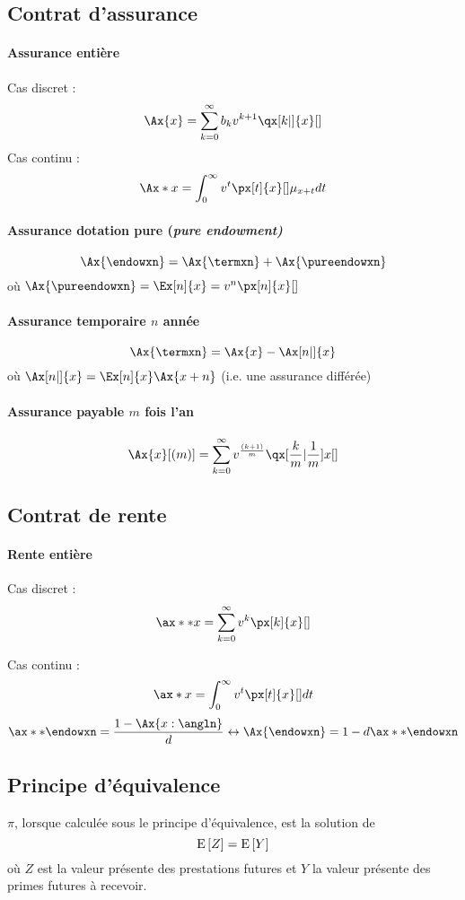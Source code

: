 \documentclass[10pt, french]{article}
\begin{document}
\begin{multicols*}{3}
\subsection*{Contrat d'assurance}
\paragraph{Assurance entière}
Cas discret : 
\[\Ax{x} = \sum_{k=0}^{\infty} b_k v^{k+1} \qx[k|]{x}[]\]
Cas continu : 
\[\Ax*{x} = \int_{0}^{\infty} v^t \px[t]{x}[] \mu_{x+t} dt  \]

\paragraph{Assurance dotation pure (\emph{pure endowment)}}
\[\Ax{\endowxn} = \Ax{\termxn} + \Ax{\pureendowxn}\]
où $\Ax{\pureendowxn} = \Ex[n]{x} = v^n \px[n]{x}[]$

\paragraph{Assurance temporaire $n$ année}
\[\Ax{\termxn} = \Ax{x} - \Ax[n|]{x} \]
où $\Ax[n|]{x}  = \Ex[n]{x} \Ax{x+n}$ (i.e. une assurance différée)

\paragraph{Assurance payable $m$ fois l'an}
\[\Ax{x}[(m)] = \sum_{k=0}^{\infty} v^{\frac{(k+1)}{m}} \qx[\frac{k}{m} | \frac{1}{m}]{x}[] \]


\subsection*{Contrat de rente}
\paragraph{Rente entière} Cas discret : 
\[\ax**{x} = \sum_{k=0}^{\infty} v^{k} \px[k]{x}[]  \]

Cas continu : 
\[\ax*{x} = \int_{0}^{\infty}  v^t \px[t]{x}[] dt \]
\[\ax**{\endowxn} = \frac{1 - \Ax{x:\angln}}{d} \leftrightarrow \Ax{\endowxn} =1 - d \ax**{\endowxn}\]




\subsection*{Principe d'équivalence}
$\pi$, lorsque calculée sous le principe d'équivalence, est la solution de
\[\mathrm{E} \left[ Z \right] = \mathrm{E} \left[ Y \right]\]
où $Z$ est la valeur présente des prestations futures et $Y$ la valeur présente des primes futures à recevoir.


\end{multicols*}
\end{document}
